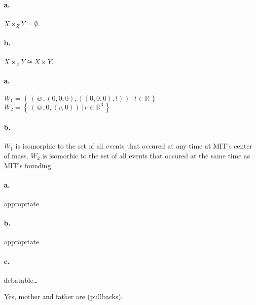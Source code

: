 \paragraph{a.}
$X \times_Z Y = \emptyset$.
\paragraph{b.}
$X \times_Z Y \cong X \times Y$.


\paragraph{a.}
$W_1 = \left\{\,\left(\smiley,(0,0,0),((0,0,0),t)\right)\,\vert\,t\in\mathbb{R}\,\right\}$
$W_2 = \left\{\,\left(\smiley,0,(r,0)\right)\,\vert\,r\in\mathbb{R}^3\,\right\}$
\paragraph{b.}
$W_1$ is isomorphic to the set of all events that occured at any time
at MIT's center of mass.  $W_2$ is isomorhic to the set of all events
that occured at the same time as MIT's founding.


\paragraph{a.}
appropriate
\paragraph{b.}
appropriate
\paragraph{c.}
debatable\ldots


Yes, mother and father are (pullbacks).




